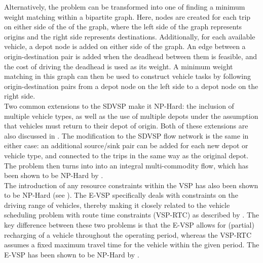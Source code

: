 \documentclass[]{article}
\begin{document}
Alternatively, the problem can be transformed into one of finding a minimum weight matching within a bipartite graph. Here, nodes are created for each trip on either side of the of the graph, where the left side of the graph represents origins and the right side represents destinations. Additionally, for each available vehicle, a depot node is added on either side of the graph. An edge between a origin-destination pair is added when the deadhead between them is feasible, and the cost of driving the deadhead is used as its weight. A minimum weight matching in this graph can then be used to construct vehicle tasks by following origin-destination pairs from a depot node on the left side to a depot node on the right side. \\
Two common extensions to the SDVSP make it NP-Hard: the inclusion of multiple vehicle types, as well as the use of multiple depots under the assumption that vehicles must return to their depot of origin. Both of these extensions are also discussed in \citet{Bunte2009}. The modification to the SDVSP flow network is the same in either case: an additional source/sink pair can be added for each new depot or vehicle type, and connected to the trips in the same way as the original depot. The problem then turns into into an integral multi-commodity flow, which has been shown to be NP-Hard by \citet{Even1975}. \\
The introduction of any resource constraints within the VSP has also been shown to be NP-Hard (see \citet{Bodin1983}). The E-VSP specifically deals with constraints on the driving range of vehicles, thereby making it closely related to the vehicle scheduling problem with route time constraints (VSP-RTC) as described by \citet{Haghani2002}. The key difference between these two problems is that the E-VSP allows for (partial) recharging of a vehicle throughout the operating period, whereas the VSP-RTC assumes a fixed maximum travel time for the vehicle within the given period. The E-VSP has been shown to be NP-Hard by \citet{Sassi2014}. \\\\
\end{document}

